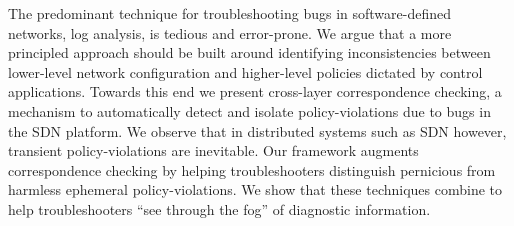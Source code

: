The predominant technique for troubleshooting bugs in software-defined networks,
log analysis, is tedious and error-prone. We argue that a more principled
approach should be built around identifying inconsistencies between lower-level
network configuration and higher-level policies dictated by control
applications. Towards this end we present
cross-layer correspondence checking, a mechanism to automatically detect and
isolate policy-violations due to bugs in the SDN platform. We observe that in
distributed systems such as SDN however,
transient policy-violations are inevitable.
Our \simulator{} framework augments correspondence checking by helping troubleshooters
distinguish pernicious from harmless ephemeral policy-violations. We
show that these techniques combine to help troubleshooters ``see through the fog'' of
diagnostic information.

